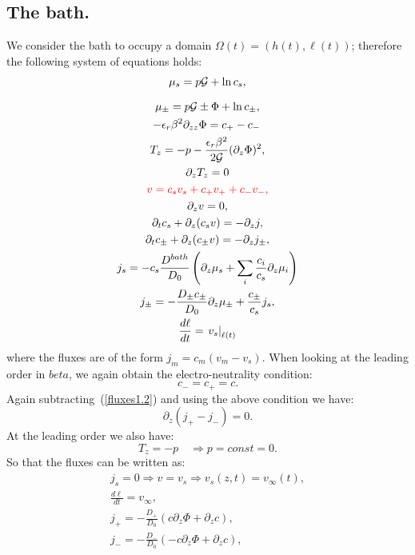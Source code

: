 \documentclass[12pt]{extarticle}
\begin{document}
\subsection{The bath.}
We consider the bath to occupy a domain $\Omega(t)=(h(t),\ell(t))$; therefore the following system of equations holds:
\begin{gather}
\begin{aligned}
\mu_s = p \mathcal{G} + \ln c_s, 
\end{aligned}\\[2.5mm]
\mu_\pm = p \mathcal{G} \pm \Phi + \ln c_\pm ,\\
-\epsilon_r\beta^2\partial_{zz} \Phi = c_+-c_-\, \\
T_z= -p-\frac{\epsilon_r\beta^2 }{2\mathcal{G}} (\partial_z \Phi)^2,\\
\partial_z T_z=0\\
\color{red}
v=c_sv_s +c_+v_++c_-v_-,\\
\partial_z v = 0,\\
\partial_t c_s + \partial_z (c_s v)=-\partial_z j,\\
\partial_t c_\pm +\partial_z(c_\pm v)= -\partial_z j_\pm,\label{fluxes1.2}\\
j_s =-c_s\frac{D^{bath}}{D_0}  \left(\partial_z\mu_s +\sum_i \frac{c_i}{c_s} \partial_z \mu_i\right)\\
j_\pm= - \frac{D_\pm c_\pm}{D_0}\partial_z \mu_\pm+\frac{c_\pm}{c_s}j_s,\\
\frac{d\ell}{dt}=\left.v_s\right|_{\ell(t)}
\end{gather}
where the fluxes are of the form $j_m=c_m (v_m-v_s)$.
When looking at the leading order in $beta$, we again obtain the electro-neutrality condition:
\begin{equation}
c_-=c_+=c.
\end{equation}
Again subtracting~(\ref{fluxes1.2}) and using the above condition we have:
\begin{equation}
\partial_z(j_+-j_-)=0.\label{temp1.2}
\end{equation}
At the leading order we also have:
\begin{equation}
T_z =-p \quad \Rightarrow p=const=0.
\end{equation}
So that the fluxes can be written as:
\begin{gather}
j_s=0 \Rightarrow v=v_s \Rightarrow v_s(z,t) = v_\infty(t),\\
\frac{d\ell}{dt}=v_\infty,\\
j_+= - \frac{D_+}{D_0}\left(c\partial_z\Phi + \partial_z c\right),\\
j_-= - \frac{D_-}{D_0}\left(-c\partial_z\Phi + \partial_z c\right),
\end{gather}
\end{document}

